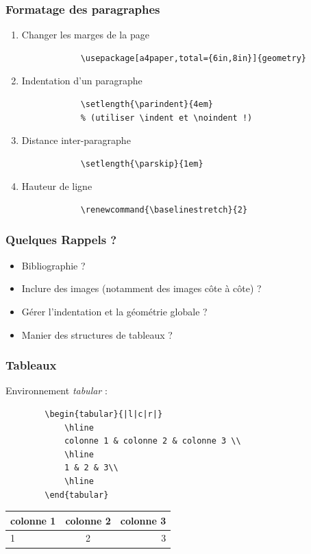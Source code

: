 \documentclass[handout]{beamer}
\begin{document}
\begin{frame}[fragile=singleslide]
	\frametitle{Formatage des paragraphes}

	\begin{enumerate}
		\item Changer les marges  de la page\\

			\begin{verbatim}
			\usepackage[a4paper,total={6in,8in}]{geometry}
			\end{verbatim}
		\item Indentation d'un paragraphe\\

			\begin{verbatim}
			\setlength{\parindent}{4em}
			% (utiliser \indent et \noindent !)
			\end{verbatim}
		\item Distance inter-paragraphe\\

			\begin{verbatim}
			\setlength{\parskip}{1em}
			\end{verbatim}
		\item Hauteur de ligne\\
			\begin{verbatim}
			\renewcommand{\baselinestretch}{2}
			\end{verbatim}
	\end{enumerate}
\end{frame}

\begin{frame}
	\frametitle{Quelques Rappels ?}
	\begin{itemize}
		\item Bibliographie ?
		\item Inclure des images (notamment des images côte à côte) ?
		\item Gérer l'indentation et la géométrie globale ?
		\item Manier des structures de tableaux ?
	\end{itemize}
\end{frame}

\begin{frame}[fragile=singleslide]
	\frametitle{Tableaux}
	\centering
	Environnement \textit{tabular} :
	\begin{verbatim}
		\begin{tabular}{|l|c|r|}
			\hline
			colonne 1 & colonne 2 & colonne 3 \\
			\hline
			1 & 2 & 3\\
			\hline
		\end{tabular}
	\end{verbatim}

	\begin{tabular}{|l|c|r|}
		\hline
		colonne 1 & colonne 2 & colonne 3 \\
		\hline
		1 & 2 & 3\\
		\hline
	\end{tabular}

\end{frame}
\end{document}
